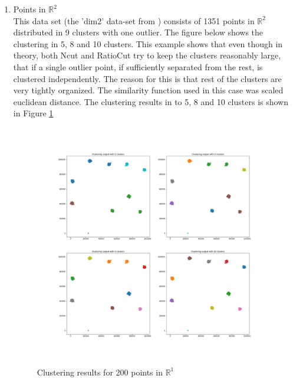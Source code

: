\documentclass[10pt,a4paper, nocenter]{report}
\begin{document}
\begin{enumerate}
        \item{Points in $\mathbb{R}^2$}\\
        This data set (the 'dim2' data-set from \cite{DIMLow}) consists of 1351 points in $\mathbb{R}^2$ distributed in 9 clusters with one outlier. The figure below shows the clustering in 5, 8 and 10 clusters. This example shows that even though in theory, both Ncut and RatioCut try to keep the clusters reasonably large, that if a single outlier point, if sufficiently separated from the rest, is clustered independently. The reason for this is that rest of the clusters are very tightly organized. The similarity function used in this case was scaled euclidean distance. The clustering results in to 5, 8 and 10 clusters is shown in Figure \ref{fig:2dresults}
        \begin{figure}[h]
        \includegraphics[width=\textwidth]{../../images/2DCluster.jpg}
        \caption{Clustering results for 200 points in $\mathbb{R}^1$}
        \label{fig:2dresults}
        \end{figure}


\end{enumerate}
\end{document}
